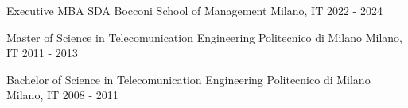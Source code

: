 
\begin{cventries}
  \cventrynodata
    {Executive MBA} %
    {SDA Bocconi School of Management} %
    {Milano, IT} %
    {2022 - 2024} %
    
  \cventrynodata
    {Master of Science in Telecomunication Engineering} %
    {Politecnico di Milano} %
    {Milano, IT} %
    {2011 - 2013} %
    
  \cventrynodata
    {Bachelor of Science in Telecomunication Engineering} %
    {Politecnico di Milano} %
    {Milano, IT} %
    {2008 - 2011} %
\end{cventries}
